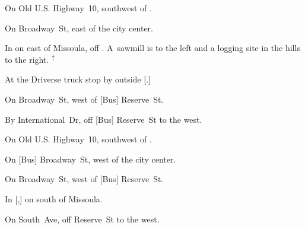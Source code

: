 

\begin{LocationList}

On  Old U.S. Highway~10, southwest of  .

On Broadway~St, east of the city center.

In  on  east of Missoula, off  .
A~sawmill is to the left and a logging site in the hills to the right.%
\textsuperscript{\scriptsize $\dagger$}

At the Driverse truck stop by   outside [.]

\Location{\GarageHQ \Garage}
On Broadway~St, west of [Bus]  Reserve~St.

By International~Dr, off [Bus]  Reserve~St to the west.

On  Old U.S. Highway~10, southwest of  .

On [Bus] Broadway~St, west of the city center.

On Broadway~St, west of [Bus]  Reserve~St.

\Location{\TruckStop \Gas \Rest \Weigh}
In [,] on   south of Missoula.

On South~Ave, off  Reserve~St to the west.

\end{LocationList}
